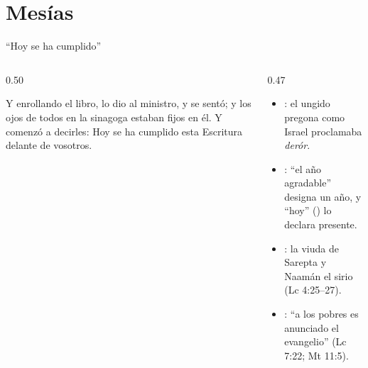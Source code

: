 \section{Mesías}

\begin{frame}{``Hoy se ha cumplido''}
\begin{columns}[c,onlytextwidth]
\begin{column}{0.50\textwidth}
\begin{cita}Y enrollando el libro, lo dio al ministro, y se sentó; y los ojos de todos en la sinagoga estaban fijos en él. Y comenzó a decirles: Hoy se ha cumplido esta Escritura delante de vosotros.\end{cita}
\end{column}
\begin{column}{0.47\textwidth}\scriptsize
\begin{itemize}
\item {}: el ungido pregona  como Israel proclamaba \emph{derór}.
\item {}: ``el año agradable'' designa un año, y ``hoy'' () lo declara presente.
\item {}: la viuda de Sarepta y Naamán el sirio (Lc 4:25--27).
\item {}: ``a los pobres es anunciado el evangelio'' (Lc 7:22; Mt 11:5).
\end{itemize}
\end{column}
\end{columns}
\end{frame}

